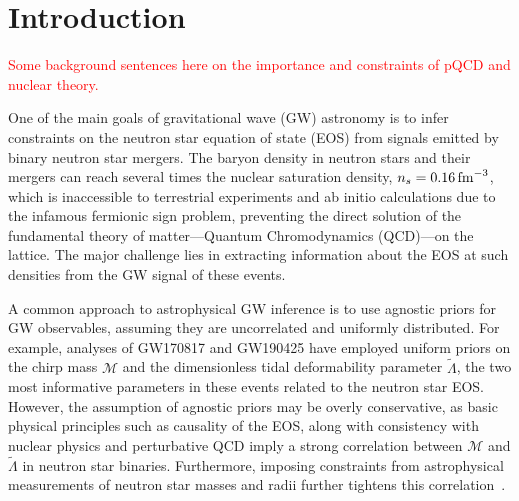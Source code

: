 \documentclass[twocolumn]{aastex631}
\newcommand{\red}[1]{\textcolor{red}{#1}}
\begin{document}
		
\section{Introduction} \label{sec:Intro}
	
\red{Some background sentences here on the  importance and constraints of pQCD and nuclear theory.}

One of the main goals of gravitational wave (GW) astronomy is to infer constraints on the neutron star equation of state (EOS) from signals emitted by binary neutron star mergers.
The baryon density in neutron stars and their mergers can reach several times the nuclear saturation density, $n_s=0.16\,{\rm fm}^{-3}$, which is inaccessible to terrestrial experiments and ab initio calculations due to the infamous fermionic sign problem, preventing the direct solution of the fundamental theory of matter—Quantum Chromodynamics (QCD)—on the lattice.
The major challenge lies in extracting information about the EOS at such densities from the GW signal of these events.

A common approach to astrophysical GW inference is to use agnostic priors for GW observables, assuming they are uncorrelated and uniformly distributed.
For example, analyses of GW170817 \citep[e.g.,][]{abbott17_170817observation, abbott18_170817EOS, abbott19_170817Properties} and GW190425 \citep[e.g.,][]{abbott20_190425} have employed uniform priors on the chirp mass $\mathcal{M}$ and the dimensionless tidal deformability parameter $\tilde{\Lambda}$, the two most informative parameters in these events related to the neutron star EOS.
However, the assumption of agnostic priors may be overly conservative, as basic physical principles such as causality of the EOS, along with consistency with nuclear physics and perturbative QCD imply a strong correlation between $\mathcal{M}$ and $\tilde{\Lambda}$ in neutron star binaries. 
Furthermore, imposing constraints from astrophysical measurements of neutron star masses and radii further tightens this correlation~\citep{altiparmak22, Ecker:2022dlg}.
\end{document}

